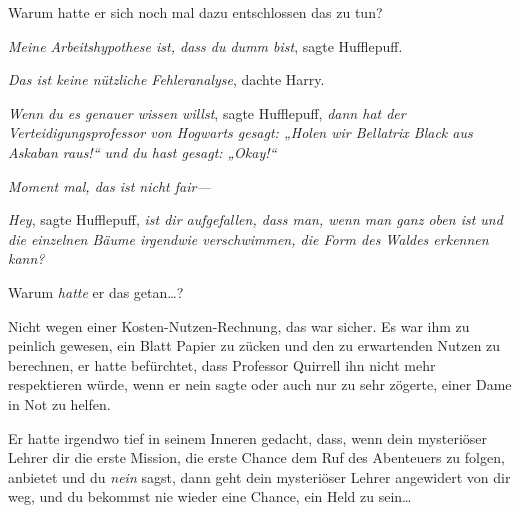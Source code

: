 Warum hatte er sich noch mal dazu entschlossen das zu tun?

\emph{Meine Arbeitshypothese ist, dass du dumm bist}, sagte Hufflepuff.

\emph{Das ist keine nützliche Fehleranalyse}, dachte Harry.

\emph{Wenn du es genauer wissen willst}, sagte Hufflepuff, \emph{dann hat der Verteidigungsprofessor von Hogwarts gesagt: „Holen wir Bellatrix Black aus Askaban raus!“ und du hast gesagt: „Okay!“}

\emph{Moment mal, das ist nicht fair—}

\emph{Hey}, sagte Hufflepuff, \emph{ist dir aufgefallen, dass man, wenn man ganz oben ist und die einzelnen Bäume irgendwie verschwimmen, die Form des Waldes erkennen kann?}

Warum \emph{hatte} er das getan…?

Nicht wegen einer Kosten-Nutzen-Rechnung, das war sicher. Es war ihm zu peinlich gewesen, ein Blatt Papier zu zücken und den zu erwartenden Nutzen zu berechnen, er hatte befürchtet, dass Professor Quirrell ihn nicht mehr respektieren würde, wenn er nein sagte oder auch nur zu sehr zögerte, einer Dame in Not zu helfen.

Er hatte irgendwo tief in seinem Inneren gedacht, dass, wenn dein mysteriöser Lehrer dir die erste Mission, die erste Chance dem Ruf des Abenteuers zu folgen, anbietet und du \emph{nein} sagst, dann geht dein mysteriöser Lehrer angewidert von dir weg, und du bekommst nie wieder eine Chance, ein Held zu sein…


